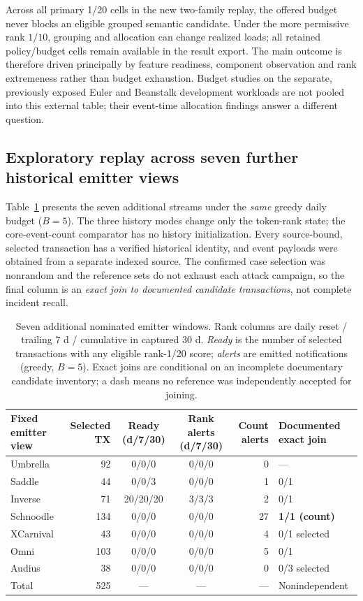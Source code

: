 \documentclass[preprint,12pt,authoryear]{elsarticle}
\begin{document}
Across all primary 1/20 cells in the new two-family replay, the offered budget never blocks an eligible grouped semantic candidate. Under the more permissive rank $1/10$, grouping and allocation can change realized loads; all retained policy/budget cells remain available in the result export. The main outcome is therefore driven principally by feature readiness, component observation and rank extremeness rather than budget exhaustion. Budget studies on the separate, previously exposed Euler and Beanstalk development workloads are not pooled into this external table; their event-time allocation findings answer a different question.

\subsection{Exploratory replay across seven further historical emitter views}\label{sec:sevenviews}
Table~\ref{tab:sevenstreams} presents the seven additional streams under the \emph{same} greedy daily budget ($B=5$). The three history modes change only the token-rank state; the core-event-count comparator has no history initialization. Every source-bound, selected transaction has a verified historical identity, and event payloads were obtained from a separate indexed source. The confirmed case selection was nonrandom and the reference sets do not exhaust each attack campaign, so the final column is an \emph{exact join to documented candidate transactions}, not complete incident recall.

\begin{table}[htbp]
\centering\scriptsize
\caption{Seven additional nominated emitter windows. Rank columns are daily reset / trailing 7 d / cumulative in captured 30 d. \emph{Ready} is the number of selected transactions with any eligible rank-1/20 score; \emph{alerts} are emitted notifications (greedy, $B=5$). Exact joins are conditional on an incomplete documentary candidate inventory; a dash means no reference was independently accepted for joining.}
\label{tab:sevenstreams}
\setlength{\tabcolsep}{4pt}
\begin{tabularx}{\linewidth}{@{}>{\raggedright\arraybackslash}X r c c r l@{}}
\toprule
Fixed emitter view & Selected TX & Ready (d/7/30) & Rank alerts (d/7/30) & Count alerts & Documented exact join \\
\midrule
Umbrella & 92 & 0/0/0 & 0/0/0 & 0 & --- \\
Saddle & 44 & 0/0/3 & 0/0/0 & 1 & 0/1 \\
Inverse & 71 & 20/20/20 & 3/3/3 & 2 & 0/1 \\
Schnoodle & 134 & 0/0/0 & 0/0/0 & 27 & \textbf{1/1 (count)} \\
XCarnival & 43 & 0/0/0 & 0/0/0 & 4 & 0/1 selected \\
Omni & 103 & 0/0/0 & 0/0/0 & 5 & 0/1 \\
Audius & 38 & 0/0/0 & 0/0/0 & 0 & 0/3 selected \\
\midrule
Total & 525 & --- & --- & --- & Nonindependent \\
\bottomrule
\end{tabularx}
\end{table}
\end{document}

